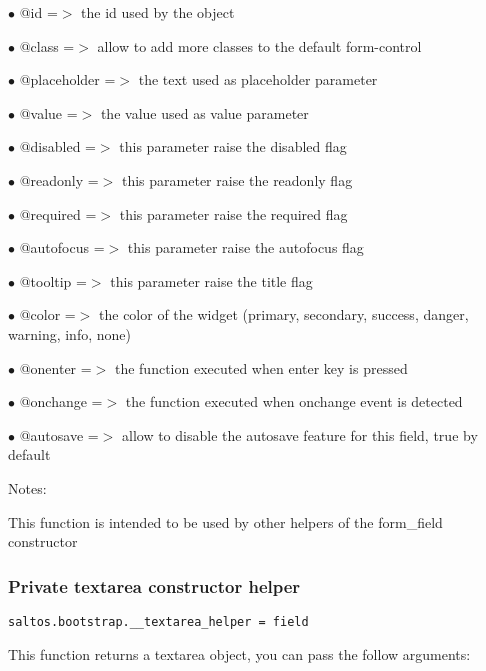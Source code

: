 \documentclass[a4paper]{article}
\begin{document}
\begin{compactitem}
\item[\color{myblue}$\bullet$] @id          =$>$ the id used by the object
\item[\color{myblue}$\bullet$] @class       =$>$ allow to add more classes to the default form-control
\item[\color{myblue}$\bullet$] @placeholder =$>$ the text used as placeholder parameter
\item[\color{myblue}$\bullet$] @value       =$>$ the value used as value parameter
\item[\color{myblue}$\bullet$] @disabled    =$>$ this parameter raise the disabled flag
\item[\color{myblue}$\bullet$] @readonly    =$>$ this parameter raise the readonly flag
\item[\color{myblue}$\bullet$] @required    =$>$ this parameter raise the required flag
\item[\color{myblue}$\bullet$] @autofocus   =$>$ this parameter raise the autofocus flag
\item[\color{myblue}$\bullet$] @tooltip     =$>$ this parameter raise the title flag
\item[\color{myblue}$\bullet$] @color       =$>$ the color of the widget (primary, secondary, success, danger, warning, info, none)
\item[\color{myblue}$\bullet$] @onenter     =$>$ the function executed when enter key is pressed
\item[\color{myblue}$\bullet$] @onchange    =$>$ the function executed when onchange event is detected
\item[\color{myblue}$\bullet$] @autosave    =$>$ allow to disable the autosave feature for this field, true by default
\end{compactitem}

Notes:

This function is intended to be used by other helpers of the form\_field constructor

\hypertarget{toc652}{}
\subsubsection{Private textarea constructor helper}

\begin{lstlisting}
saltos.bootstrap.__textarea_helper = field
\end{lstlisting}

This function returns a textarea object, you can pass the follow arguments:
\end{document}
